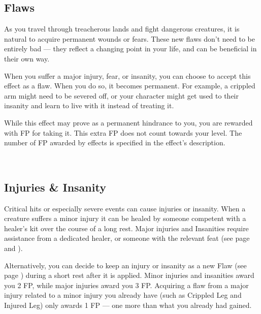 \vspace{14.0cm}

\subsection*{Flaws} \label{ssec::flaws}
    As you travel through treacherous lands and fight dangerous creatures, it is natural to acquire permanent wounds or fears.
    These new flaws don't need to be entirely bad --- they reflect a changing point in your life, and can be beneficial in their own way.

    When you suffer a major injury, fear, or insanity, you can choose to accept this effect as a flaw.
    When you do so, it becomes permanent.
    For example, a crippled arm might need to be severed off, or your character might get used to their insanity and learn to live with it instead of treating it.

    While this effect may prove as a permanent hindrance to you, you are rewarded with FP for taking it.
    This extra FP does not count towards your level.
    The number of FP awarded by effects is specified in the effect's description.


\pagebreak~
\vspace{11.5cm}

\subsection*{Injuries \& Insanity} \label{ssec::injuriesandinsanity}
    Critical hits or especially severe events can cause injuries or insanity.
    When a creature suffers a minor injury it can be healed by someone competent with a healer's kit over the course of a long rest.
    Major injuries and Insanities require assistance from a dedicated healer, or someone with the relevant feat (see page \pageref{feat::physician} and \pageref{feat::therapist}).

    Alternatively, you can decide to keep an injury or insanity as a new Flaw (see page \pageref{ssec::flaws}) during a short rest after it is applied.
    Minor injuries and insanities award you 2 FP, while major injuries award you 3 FP.
    Acquiring a flaw from a major injury related to a minor injury you already have (such as Crippled Leg and Injured Leg) only awards 1 FP --- one more than what you already had gained.

